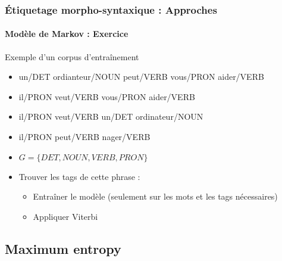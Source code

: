 \documentclass[xcolor=table]{beamer}
\begin{document}
\begin{frame}
\frametitle{Étiquetage morpho-syntaxique : Approches}
\framesubtitle{Modèle de Markov : Exercice}

\begin{exampleblock}{Exemple d'un corpus d'entraînement}
	\begin{itemize}
		\item un/DET ordianteur/NOUN peut/VERB vous/PRON aider/VERB
		\item il/PRON veut/VERB vous/PRON aider/VERB
		\item il/PRON veut/VERB un/DET ordinateur/NOUN
		\item il/PRON peut/VERB nager/VERB
	\end{itemize}
\end{exampleblock}

\begin{itemize}
	\item $G = \{DET, NOUN, VERB, PRON\}$
	\item Trouver les tags de cette phrase : 
	\begin{itemize}
		\item Entraîner le modèle (seulement sur les mots et les tags nécessaires)
		\item Appliquer Viterbi
	\end{itemize}
\end{itemize}

\end{frame}

\subsection{Maximum entropy}
\end{document}

